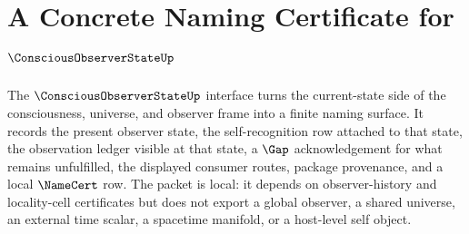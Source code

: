 \chapter{A Concrete Naming Certificate for $\ConsciousObserverStateUp$}
\label{ch:concrete-instances-consciousobserverstate-namecert}

The $\ConsciousObserverStateUp$ interface turns the current-state side of the consciousness, universe, and observer frame into a finite naming surface. It records the present observer state, the self-recognition row attached to that state, the observation ledger visible at that state, a $\Gap$ acknowledgement for what remains unfulfilled, the displayed consumer routes, package provenance, and a local $\NameCert$ row. The packet is local: it depends on observer-history and locality-cell certificates but does not export a global observer, a shared universe, an external time scalar, a spacetime manifold, or a host-level self object.

